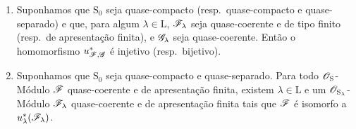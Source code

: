 \begin{theorem}[8.5.2]
\label{IV.8.5.2}
\begin{enumerate}[label=(\roman*)]
  \item Suponhamos que $\mathrm{S}_0$ seja quase-compacto (resp.\ quase-compacto e quase-separado) e que, para algum $\lambda\in\mathrm{L}$, $\mathscr{F}_\lambda$ seja quase-coerente e de tipo finito (resp.\ de apresentação finita), e $\mathscr{G}_\lambda$ seja quase-coerente.
Então o homomorfismo $u_{\mathscr{F},\mathscr{G}}^*$ é injetivo (resp.\ bijetivo).
  \item Suponhamos que $\mathrm{S}_0$ seja quase-compacto e quase-separado.
Para todo $\mathscr{O}_\mathrm{S}$-Módulo $\mathscr{F}$ quase-coerente e de apresentação finita, existem $\lambda\in\mathrm{L}$ e um $\mathscr{O}_{\mathrm{S}_\lambda}$-Módulo $\mathscr{F}_\lambda$ quase-coerente e de apresentação finita tais que $\mathscr{F}$ é isomorfo a $u_\lambda^*(\mathscr{F}_\lambda)$.
\end{enumerate}
\end{theorem}

